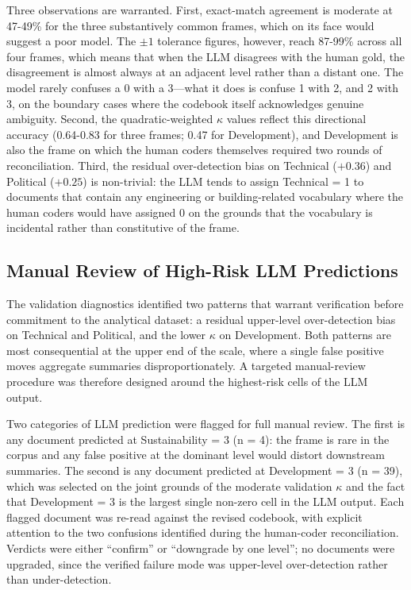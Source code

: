 \documentclass[12pt, journal]{IEEEtran}
\begin{document}
Three observations are warranted. First, exact-match agreement is moderate at 47-49\% for the three substantively common frames, which on its face would suggest a poor model. The $\pm 1$ tolerance figures, however, reach 87-99\% across all four frames, which means that when the LLM disagrees with the human gold, the disagreement is almost always at an adjacent level rather than a distant one. The model rarely confuses a 0 with a 3---what it does is confuse 1 with 2, and 2 with 3, on the boundary cases where the codebook itself acknowledges genuine ambiguity. Second, the quadratic-weighted $\kappa$ values reflect this directional accuracy (0.64-0.83 for three frames; 0.47 for Development), and Development is also the frame on which the human coders themselves required two rounds of reconciliation. Third, the residual over-detection bias on Technical ($+0.36$) and Political ($+0.25$) is non-trivial: the LLM tends to assign Technical = 1 to documents that contain any engineering or building-related vocabulary where the human coders would have assigned 0 on the grounds that the vocabulary is incidental rather than constitutive of the frame.

\subsection{Manual Review of High-Risk LLM Predictions}
The validation diagnostics identified two patterns that warrant verification before commitment to the analytical dataset: a residual upper-level over-detection bias on Technical and Political, and the lower $\kappa$ on Development. Both patterns are most consequential at the upper end of the scale, where a single false positive moves aggregate summaries disproportionately. A targeted manual-review procedure was therefore designed around the highest-risk cells of the LLM output.

Two categories of LLM prediction were flagged for full manual review. The first is any document predicted at Sustainability = 3 (n = 4): the frame is rare in the corpus and any false positive at the dominant level would distort downstream summaries. The second is any document predicted at Development = 3 (n = 39), which was selected on the joint grounds of the moderate validation $\kappa$ and the fact that Development = 3 is the largest single non-zero cell in the LLM output. Each flagged document was re-read against the revised codebook, with explicit attention to the two confusions identified during the human-coder reconciliation. Verdicts were either ``confirm'' or ``downgrade by one level''; no documents were upgraded, since the verified failure mode was upper-level over-detection rather than under-detection.
\end{document}
